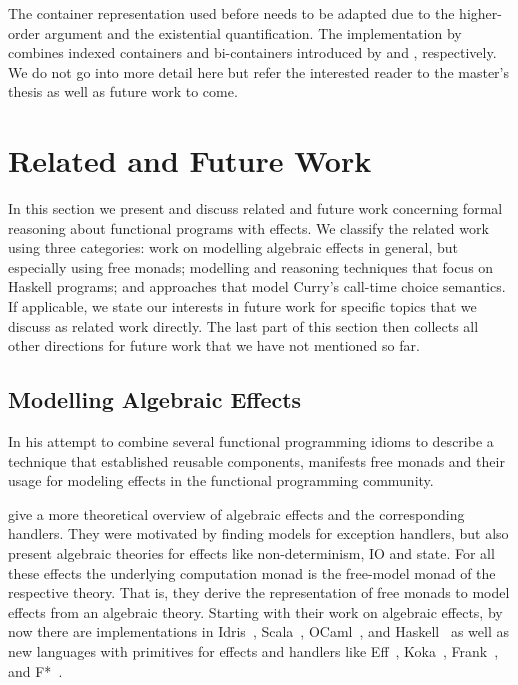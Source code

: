 The container representation used before needs to be adapted due to the higher-order argument and the existential quantification.
The implementation by \citeauthor{bunkenburg2019modeling} combines indexed containers and bi-containers introduced by \citet{altenkirch2015indexed} and \citet{ghani2007higher}, respectively.
We do not go into more detail here but refer the interested reader to the master's thesis as well as future work to come.

\section{Related and Future Work}

In this section we present and discuss related and future work concerning formal reasoning about functional programs with effects.
We classify the related work using three categories: work on modelling algebraic effects in general, but especially using free monads; modelling and reasoning techniques that focus on Haskell programs; and approaches that model Curry's call-time choice semantics.
If applicable, we state our interests in future work for specific topics that we discuss as related work directly.
The last part of this section then collects all other directions for future work that we have not mentioned so far.

\subsection{Modelling Algebraic Effects}

In his attempt to combine several functional programming idioms to describe a technique that established reusable components, \citet{swierstra2008data} manifests free monads and their usage for modeling effects in the functional programming community.

\citet{plotkin2009handlers} give a more theoretical overview of algebraic effects and the corresponding handlers.
They were motivated by finding models for exception handlers, but also present algebraic theories for effects like non-determinism, IO and state.
For all these effects the underlying computation monad is the free-model monad of the respective theory.
That is, they derive the representation of free monads to model effects from an algebraic theory.
Starting with their work on algebraic effects, by now there are implementations in Idris~\citep{brady2013programming}, Scala~\citep{brachthauser2017effekt}, OCaml~\citep{kiselyov2018eff}, and Haskell~\citep{kiselyov2015freer,kammar2013handlers} as well as new languages with primitives for effects and handlers like Eff~\citep{pretnar2015introduction}, Koka~\citep{leijen2016algebraic}, Frank~\citep{lindley2017be}, and F*~\citep{swamy2016dependent}.

